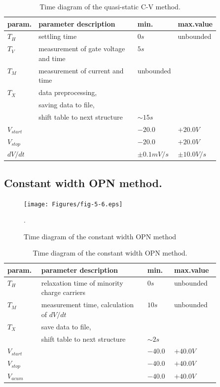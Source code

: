 \begin{table}[h!]\centering
  \begin{tabular}{ l p{0.5\linewidth} l l }
    param.      & parameter description & min. & max.value\\
    \hline
    $T_H$       & settling time \dotfill & $0 s$ & unbounded\\
    $T_V$       & measurement of gate voltage and time \dotfill & $5s$\\
    $T_M$       & measurement of current and time \dotfill & unbounded\\
    $T_X$       & data preprocessing,\\
                & saving data to file,\\
                & shift table to next structure \dotfill & $\sim 15s$\\
    $V_{start}$ & \dotfill & $-20.0$ & $+20.0 V$\\
    $V_{stop}$  & \dotfill & $-20.0$ & $+20.0 V$\\
    $dV/dt$     & \dotfill & $\pm 0.1mV/s$ & $\pm 10.0V/s$\\
    \hline
  \end{tabular}
  \caption[Time diagram of the quasi-static C-V method]{Time diagram
    of the quasi-static C-V method.}\label{tab:5.3}
\end{table}

\newpage
\subsection{Constant width OPN method.}\label{sec:5.4.4}

\begin{figure}[h!]\centering
  \texttt{[image: Figures/fig-5-6.eps]}
  \caption[Time diagram of constant width OPN method]{Time diagram of
    the constant width OPN method}.\label{fig:5.6}
\end{figure}

\begin{table}[h!]\centering
  \begin{tabular}{ l p{0.5\linewidth} l l }
    param.      & parameter description & min. & max.value\\
    \hline
    $T_H$       & relaxation time of minority charge carriers \dotfill & $0 s$ & unbounded\\
    $T_M$       & measurement time, calculation of $dV/dt$ \dotfill & $10 s$ & unbounded\\
    $T_X$       & save data to file,\\
                & shift table to next structure \dotfill & $\sim 2s$\\
    $V_{start}$ & \dotfill & $-40.0$ & $+40.0 V$\\
    $V_{stop}$  & \dotfill & $-40.0$ & $+40.0 V$\\
    $V_{acum}$  & \dotfill & $-40.0$ & $+40.0 V$\\
    \hline
  \end{tabular}
  \caption[Time diagram of constant width OPN method]{Time diagram of
    the constant width OPN method.}\label{tab:5.4}
\end{table}


